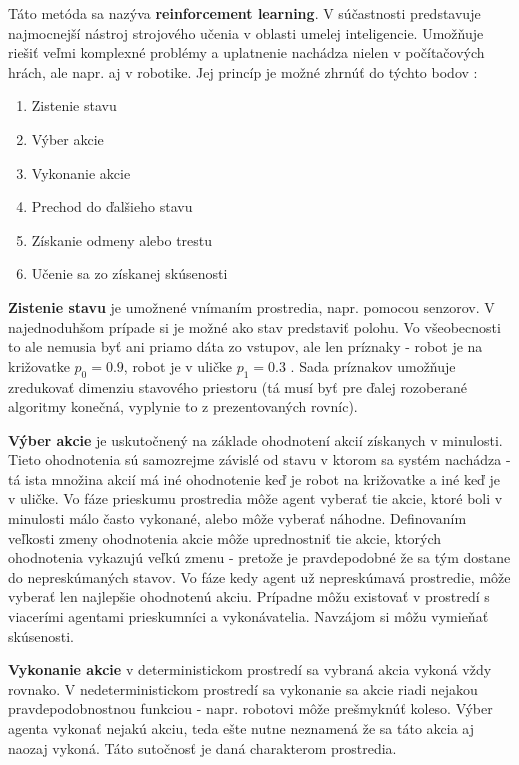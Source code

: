 Táto metóda sa nazýva  {\bf reinforcement learning}. V súčastnosti predstavuje
najmocnejší nástroj strojového učenia v oblasti umelej inteligencie. Umožňuje
riešiť veľmi komplexné problémy a uplatnenie nachádza nielen v počítačových
hrách, ale napr. aj v robotike.
Jej princíp je možné zhrnúť do týchto bodov :

\begin{enumerate}
  \item Zistenie stavu
  \item Výber akcie
  \item Vykonanie akcie
  \item Prechod do ďalšieho stavu
  \item Získanie odmeny alebo trestu
  \item Učenie sa zo získanej skúsenosti
\end{enumerate}

 {\bf Zistenie stavu} je umožnené vnímaním prostredia, napr. pomocou senzorov.
V najednoduhšom prípade si je možné ako stav predstaviť polohu. Vo
všeobecnosti to ale nemusia byť ani priamo dáta zo vstupov, ale len
príznaky - robot je na križovatke $p_0 = 0.9$, robot je v uličke $p_1 = 0.3$ .
Sada príznakov umožňuje zredukovať dimenziu stavového priestoru (tá musí
byť pre ďalej rozoberané algoritmy konečná, vyplynie to z prezentovaných rovníc).

{\bf Výber akcie} je uskutočnený na základe ohodnotení akcií získanych
v minulosti. Tieto ohodnotenia sú samozrejme závislé od stavu v ktorom sa
systém nachádza - tá ista množina akcií má iné ohodnotenie keď je robot na
križovatke a iné keď je v uličke. Vo fáze prieskumu prostredia môže agent
vyberať tie akcie, ktoré boli v minulosti málo často vykonané, alebo môže vyberať náhodne.
Definovaním veľkosti zmeny ohodnotenia akcie môže uprednostniť tie akcie,
ktorých ohodnotenia vykazujú veľkú zmenu - pretože je pravdepodobné že sa
tým dostane do nepreskúmaných stavov.
Vo fáze kedy agent už nepreskúmavá prostredie, môže vyberať len najlepšie ohodnotenú akciu.
Prípadne môžu existovať v prostredí s viacerími agentami prieskumníci a vykonávatelia.
Navzájom si môžu vymieňať skúsenosti.

{\bf Vykonanie akcie} v deterministickom prostredí sa vybraná akcia vykoná vždy rovnako.
 V nedeterministickom prostredí sa vykonanie sa akcie riadi nejakou pravdepodobnostnou funkciou - napr. robotovi môže prešmyknúť
koleso. Výber agenta vykonať nejakú akciu, teda ešte nutne neznamená že sa táto akcia aj naozaj vykoná.
Táto sutočnosť je daná charakterom prostredia.

